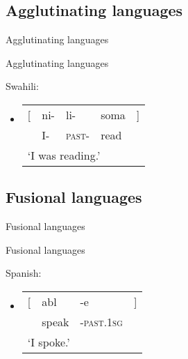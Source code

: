 \documentclass{beamer}
\newcommand{\subonethree}{Agglutinating languages}
\newcommand{\subonefour}{Fusional languages}
\begin{document}
    \subsection{\subonethree}
      \begin{frame}{\subonethree}
        \begin{alertblock}{Agglutinating languages}
          
        \end{alertblock}
        \begin{example}
          Swahili:
          \begin{itemize}
            \item \begin{tabular}{r @{} l l l @{} l}
                    [  & ni-  & li-             & soma  & ] \\
                       & I-   & \textsc{past-}  & read  & \\
                    \multicolumn{5}{l}{`I was reading.'}
                  \end{tabular}
          \end{itemize}
        \end{example}
      \end{frame}

    \subsection{\subonefour}
      \begin{frame}{\subonefour}
        \begin{alertblock}{Fusional languages}
          
        \end{alertblock}
        \begin{example}
          Spanish:
          \begin{itemize}
            \item \begin{tabular}{r @{} l l @{} l}
                    [  & abl    & -e  & ] \\
                       & speak  & \textsc{-past.1sg} & \\
                    \multicolumn{4}{l}{`I spoke.'}
                  \end{tabular}
          \end{itemize}
        \end{example}
      \end{frame}
\end{document}
